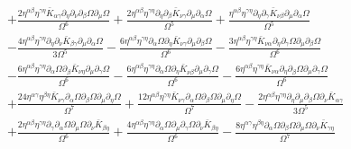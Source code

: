 \documentclass[10pt,letterpaper]{article}
\begin{document}
\begin{align}
&+ \frac{2 \eta^{\alpha \beta} \eta^{\gamma \eta} \bar{K}_{\alpha \gamma} \partial_{\eta}\partial_{\nu}\partial_{\beta}\Omega \partial_{\mu}\Omega}{\Omega^6} + \frac{2 \eta^{\alpha \beta} \eta^{\gamma \eta} \partial_{\eta}\partial_{\beta}\bar{K}_{\nu \gamma} \partial_{\mu}\partial_{\alpha}\Omega}{\Omega^5} + \frac{\eta^{\alpha \beta} \eta^{\gamma \eta} \partial_{\eta}\partial_{\gamma}\bar{K}_{\nu \beta} \partial_{\mu}\partial_{\alpha}\Omega}{\Omega^5} \nonumber \\
&-  \frac{4 \eta^{\alpha \beta} \eta^{\gamma \eta} \partial_{\eta}\partial_{\nu}\bar{K}_{\beta \gamma} \partial_{\mu}\partial_{\alpha}\Omega}{3 \Omega^5} -  \frac{6 \eta^{\alpha \beta} \eta^{\gamma \eta} \partial_{\alpha}\Omega \partial_{\eta}\bar{K}_{\nu \gamma} \partial_{\mu}\partial_{\beta}\Omega}{\Omega^6} -  \frac{3 \eta^{\alpha \beta} \eta^{\gamma \eta} \bar{K}_{\nu \alpha} \partial_{\eta}\partial_{\gamma}\Omega \partial_{\mu}\partial_{\beta}\Omega}{\Omega^6} \nonumber \\
&-  \frac{6 \eta^{\alpha \beta} \eta^{\gamma \eta} \partial_{\alpha}\Omega \partial_{\beta}\bar{K}_{\nu \eta} \partial_{\mu}\partial_{\gamma}\Omega}{\Omega^6} -  \frac{6 \eta^{\alpha \beta} \eta^{\gamma \eta} \partial_{\alpha}\Omega \partial_{\eta}\bar{K}_{\nu \beta} \partial_{\mu}\partial_{\gamma}\Omega}{\Omega^6} -  \frac{6 \eta^{\alpha \beta} \eta^{\gamma \eta} \bar{K}_{\nu \alpha} \partial_{\eta}\partial_{\beta}\Omega \partial_{\mu}\partial_{\gamma}\Omega}{\Omega^6} \nonumber \\
&+ \frac{24 \eta^{\alpha \gamma} \eta^{\beta \eta} \bar{K}_{\nu \gamma} \partial_{\alpha}\Omega \partial_{\beta}\Omega \partial_{\mu}\partial_{\eta}\Omega}{\Omega^7} + \frac{12 \eta^{\alpha \beta} \eta^{\gamma \eta} \bar{K}_{\nu \gamma} \partial_{\alpha}\Omega \partial_{\beta}\Omega \partial_{\mu}\partial_{\eta}\Omega}{\Omega^7} -  \frac{2 \eta^{\alpha \beta} \eta^{\gamma \eta} \partial_{\eta}\partial_{\mu}\partial_{\beta}\Omega \partial_{\nu}\bar{K}_{\alpha \gamma}}{3 \Omega^5} \nonumber \\
&+ \frac{2 \eta^{\alpha \beta} \eta^{\gamma \eta} \partial_{\gamma}\partial_{\alpha}\Omega \partial_{\mu}\Omega \partial_{\nu}\bar{K}_{\beta \eta}}{\Omega^6} + \frac{4 \eta^{\alpha \beta} \eta^{\gamma \eta} \partial_{\alpha}\Omega \partial_{\mu}\partial_{\gamma}\Omega \partial_{\nu}\bar{K}_{\beta \eta}}{\Omega^6} -  \frac{8 \eta^{\alpha \gamma} \eta^{\beta \eta} \partial_{\alpha}\Omega \partial_{\beta}\Omega \partial_{\mu}\Omega \partial_{\nu}\bar{K}_{\gamma \eta}}{\Omega^7}\nonumber \\

\end{align}
\end{document}
